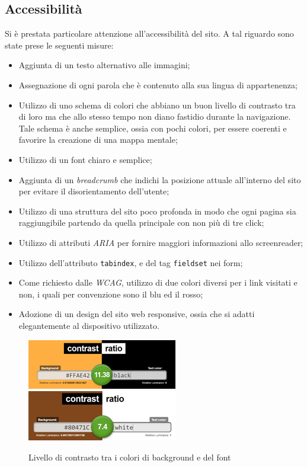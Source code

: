 \newpage
\subsection{Accessibilità}
Si è prestata particolare attenzione all'accessibilità del sito. A tal riguardo sono state prese le
seguenti misure:
\begin{itemize}
	\item Aggiunta di un testo alternativo alle immagini;
	\item Assegnazione di ogni parola che è contenuto alla sua lingua di appartenenza;
	\item Utilizzo di uno schema di colori che abbiano un buon livello di contrasto tra di loro ma
	che allo stesso tempo non diano fastidio durante la navigazione. Tale schema è anche semplice,
	ossia con pochi colori, per essere coerenti e favorire la creazione di una mappa mentale;
	\item Utilizzo di un font chiaro e semplice;
	\item Aggiunta di un \textit{breadcrumb} che indichi la posizione attuale all'interno del sito per
	evitare il disorientamento dell'utente;
	\item Utilizzo di una struttura del sito poco profonda in modo che ogni pagina sia raggiungibile
	partendo da quella principale con non più di tre click;
	\item Utilizzo di attributi \textit{ARIA} per fornire maggiori informazioni allo screenreader;
	\item Utilizzo dell'attributo \texttt{tabindex}, e del tag \texttt{fieldset} nei form;
	\item Come richiesto dalle \textit{WCAG}, utilizzo di due colori diversi per i link visitati e non,
	i quali per convenzione sono il blu ed il rosso;
	\item Adozione di un design del sito web responsive, ossia che si adatti elegantemente
	al dispositivo utilizzato.
\end{itemize}
\begin{figure}[H]
	\centering
	\includegraphics[scale=1]{resources/contrast_1.png}
	\includegraphics[scale=1]{resources/contrast_2.png}
	\caption{Livello di contrasto tra i colori di background e del font}
\end{figure}
